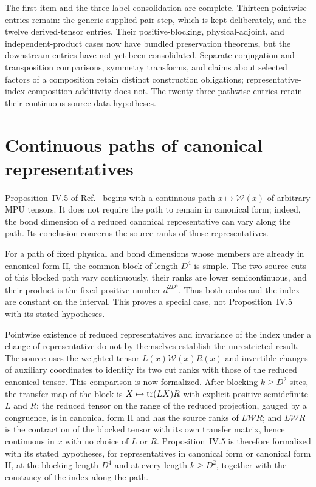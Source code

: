 \documentclass{article}
\begin{document}
The first item and the three-label consolidation are complete. Thirteen
pointwise entries remain: the generic supplied-pair step, which is kept
deliberately, and the twelve derived-tensor entries. Their positive-blocking,
physical-adjoint, and independent-product cases now have bundled preservation
theorems, but the downstream entries have not yet been consolidated. Separate
conjugation and transposition comparisons, symmetry transforms, and claims
about selected factors of a composition retain distinct construction
obligations; representative-index composition additivity does not.
The twenty-three pathwise entries retain their continuous-source-data hypotheses.

\section{Continuous paths of canonical representatives}

Proposition~IV.5 of Ref.~\cite{Cirac2017MPU} begins with a continuous path
$x\mapsto\mathcal W(x)$ of arbitrary MPU tensors. It does not require the
path to remain in canonical form; indeed, the bond dimension of a reduced
canonical representative can vary along the path. Its conclusion concerns
the source ranks of those representatives.

For a path of fixed physical and bond dimensions whose members are already
in canonical form II, the common block of length $D^4$ is simple. The two
source cuts of this blocked path vary continuously, their ranks are lower
semicontinuous, and their product is the fixed positive number $d^{2D^4}$.
Thus both ranks and the index are constant on the interval. This proves a
special case, not Proposition~IV.5 with its stated hypotheses.

Pointwise existence of reduced representatives and invariance of the index
under a change of representative do not by themselves establish the
unrestricted result. The source uses the weighted tensor
$L(x)\mathcal W(x)R(x)$ and invertible changes of auxiliary coordinates to
identify its two cut ranks with those of the reduced canonical tensor. This
comparison is now formalized. After blocking $k\geq D^2$ sites, the transfer
map of the block is $X\mapsto\operatorname{tr}(LX)R$ with explicit positive semidefinite
$L$ and $R$; the reduced tensor on the range of the reduced projection,
gauged by a congruence, is in canonical form II and has the source ranks of
$L\mathcal WR$; and $L\mathcal WR$ is the contraction of the blocked tensor
with its own transfer matrix, hence continuous in $x$ with no choice of $L$
or $R$. Proposition~IV.5 is therefore formalized with its stated hypotheses,
for representatives in canonical form or canonical form II, at the blocking
length $D^4$ and at every length $k\geq D^2$, together with the constancy of
the index along the path.
\end{document}
